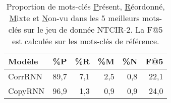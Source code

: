 \begin{table}[!ht]
    \centering
    \begin{tabular}{l|rrrr|r}
    \toprule
    \textbf{Modèle} & \textbf{\%P} & \textbf{\%R} & \textbf{\%M} & \textbf{\%N} & \textbf{F@5} \\
    \midrule
        CorrRNN & 89,7 &  7,1 &  2,5 &  0,8 & 22,1\\
        CopyRNN & 96,9 &  1,3 &  0,9 &  0,9 & 24,0\\
    \bottomrule
    \end{tabular}
    \caption{Proportion de mots-clés \underline{P}résent, \underline{R}éordonné, \underline{M}ixte et \underline{N}on-vu dans les 5 meilleurs mots-clés sur le jeu de donnée NTCIR-2. La F@5 est calculée sur les mots-clés de référence.}
    \label{tab:prmu_dist_pred_ntcir2}
\end{table}
